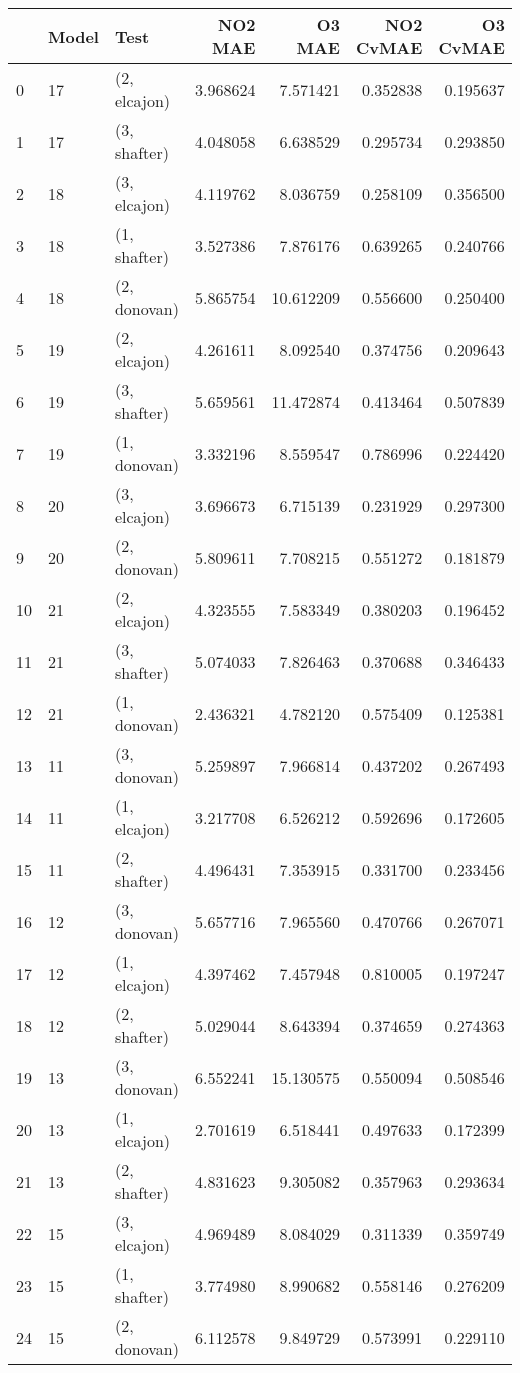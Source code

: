 \begin{tabular}{lllrrrr}
\toprule
{} & Model &          Test &   NO2 MAE &     O3 MAE &  NO2 CvMAE &  O3 CvMAE \\
\midrule
0  &    17 &  (2, elcajon) &  3.968624 &   7.571421 &   0.352838 &  0.195637 \\
1  &    17 &  (3, shafter) &  4.048058 &   6.638529 &   0.295734 &  0.293850 \\
2  &    18 &  (3, elcajon) &  4.119762 &   8.036759 &   0.258109 &  0.356500 \\
3  &    18 &  (1, shafter) &  3.527386 &   7.876176 &   0.639265 &  0.240766 \\
4  &    18 &  (2, donovan) &  5.865754 &  10.612209 &   0.556600 &  0.250400 \\
5  &    19 &  (2, elcajon) &  4.261611 &   8.092540 &   0.374756 &  0.209643 \\
6  &    19 &  (3, shafter) &  5.659561 &  11.472874 &   0.413464 &  0.507839 \\
7  &    19 &  (1, donovan) &  3.332196 &   8.559547 &   0.786996 &  0.224420 \\
8  &    20 &  (3, elcajon) &  3.696673 &   6.715139 &   0.231929 &  0.297300 \\
9  &    20 &  (2, donovan) &  5.809611 &   7.708215 &   0.551272 &  0.181879 \\
10 &    21 &  (2, elcajon) &  4.323555 &   7.583349 &   0.380203 &  0.196452 \\
11 &    21 &  (3, shafter) &  5.074033 &   7.826463 &   0.370688 &  0.346433 \\
12 &    21 &  (1, donovan) &  2.436321 &   4.782120 &   0.575409 &  0.125381 \\
13 &    11 &  (3, donovan) &  5.259897 &   7.966814 &   0.437202 &  0.267493 \\
14 &    11 &  (1, elcajon) &  3.217708 &   6.526212 &   0.592696 &  0.172605 \\
15 &    11 &  (2, shafter) &  4.496431 &   7.353915 &   0.331700 &  0.233456 \\
16 &    12 &  (3, donovan) &  5.657716 &   7.965560 &   0.470766 &  0.267071 \\
17 &    12 &  (1, elcajon) &  4.397462 &   7.457948 &   0.810005 &  0.197247 \\
18 &    12 &  (2, shafter) &  5.029044 &   8.643394 &   0.374659 &  0.274363 \\
19 &    13 &  (3, donovan) &  6.552241 &  15.130575 &   0.550094 &  0.508546 \\
20 &    13 &  (1, elcajon) &  2.701619 &   6.518441 &   0.497633 &  0.172399 \\
21 &    13 &  (2, shafter) &  4.831623 &   9.305082 &   0.357963 &  0.293634 \\
22 &    15 &  (3, elcajon) &  4.969489 &   8.084029 &   0.311339 &  0.359749 \\
23 &    15 &  (1, shafter) &  3.774980 &   8.990682 &   0.558146 &  0.276209 \\
24 &    15 &  (2, donovan) &  6.112578 &   9.849729 &   0.573991 &  0.229110 \\
\bottomrule
\end{tabular}
